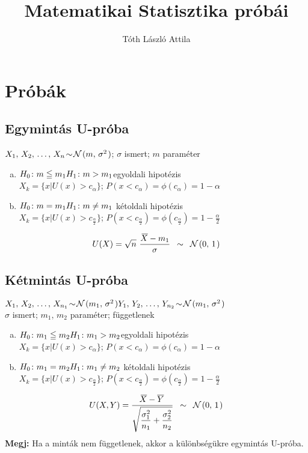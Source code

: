 \documentclass[a4paper,10pt,fleqn]{article}
\title{Matematikai Statisztika próbái}
\author{Tóth László Attila}
\newcommand{\N}[2]{\mathcal{N}\hspace{.1em}(#1,\,#2\hspace{.1em})}
\newcommand{\nminta}[4]{#1_1,\,#1_2,\,\ldots,\, #1_{#2} \! \sim \! \N{#3}{#4}}
\newcommand{\eloszlasa}{\enspace \sim \enspace}
\begin{document}
  \section*{Próbák}
  \subsection*{Egymintás U-próba}
  $\nminta{X}{n}{m}{\sigma^2}$; $\sigma$ ismert; $m$ paraméter  
  \begin{enumerate}[a)]
    \item {$H_0\colon m \leqq m_1\\ H_1\colon m > m_1$\quad egyoldali
    hipotézis\\
    $X_k=\{x|U(x)>c_\alpha\}$;\quad
    $P(x<c_\alpha)=\phi(c_\alpha)=1-\alpha$}
    \item {$H_0\colon m = m_1\\ H_1\colon m  \ne m_1$ \quad kétoldali
    hipotézis\\
    $X_k=\{x|U(x)>c_\frac{\alpha}2\}$;\quad
    $P(x<c_\frac{\alpha}2)=\phi(c_\frac{\alpha}2)=1-\frac{\alpha}2$}
  \end{enumerate}
  \[U(X) = \sqrt{n}\,\,\dfrac{\,\overline{\!X}-m_1}{\sigma}\eloszlasa \N01\]
  
  \subsection*{Kétmintás U-próba}
  $\nminta{X}{n_1}{m_1}{\sigma^2}\\
  \nminta{Y}{n_2}{m_1}{\sigma^2}$ \\
  $\sigma$ ismert; $m_1,\,m_2$  paraméter; függetlenek
  \begin{enumerate}[a)]
  \item {$H_0\colon m_1 \leqq m_2\\ H_1\colon m_1 > m_2$\quad egyoldali
    hipotézis\\
    $X_k=\{x|U(x)>c_\alpha\}$;\quad
    $P(x<c_\alpha)=\phi(c_\alpha)=1-\alpha$}
  \item {$H_0\colon m_1 = m_2\\ H_1\colon m_1 \ne m_2$ \quad kétoldali
    hipotézis\\
    $X_k=\{x|U(x)>c_\frac{\alpha}2\}$;\quad
    $P(x<c_\frac{\alpha}2)=\phi(c_\frac{\alpha}2)=1-\frac{\alpha}2$}
  \end{enumerate}
  \[U(X,Y) =
  \dfrac{\overline{\!X}-\overline{Y}}{
    \sqrt{
      \dfrac{\sigma_1^2}{n_1}+\dfrac{\sigma_2^2}{n_2}
    }
  }\eloszlasa \N01\]
  \textbf{Megj:} Ha a minták nem függetlenek, akkor a különbségükre
  egymintás U-próba.
  
\end{document}
